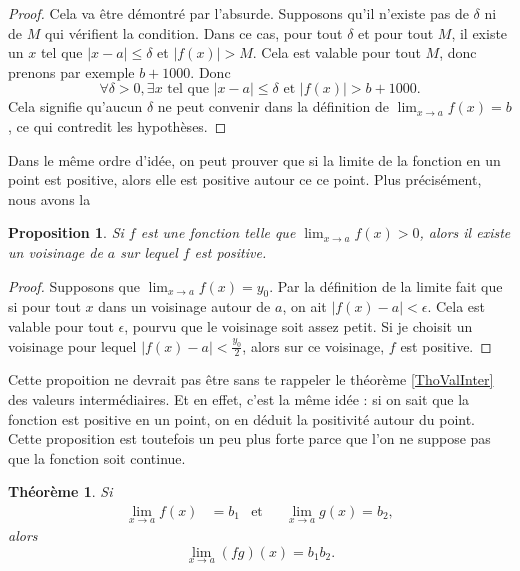 \documentclass[a4paper,12pt]{book}
\newcounter{numtho}
\theoremstyle{mes_exemples}	\newtheorem{exemple}[numtho]{Exemple}
\theoremstyle{mes_tho}
\newtheorem{proposition}[numtho]{Proposition}
\newtheorem{theorem}[numtho]{Théorème}
\begin{document}
\begin{proof}
	Cela va être démontré par l'absurde. Supposons qu'il n'existe pas de $\delta$ ni de $M$ qui vérifient la condition. Dans ce cas, pour tout $\delta$ et pour tout $M$, il existe un $x$ tel que $| x-a |\leq\delta$ et $| f(x) |> M$. Cela est valable pour tout $M$, donc prenons par exemple $b+1000$. Donc 
	\begin{equation}
	\forall\delta>0,\exists x\text{ tel que } | x-a |\leq\delta\text{ et }| f(x) |>b+1000.
	\end{equation}
	Cela signifie qu'aucun $\delta$ ne peut convenir dans la définition de $\lim_{x\to a}f(x)=b$, ce qui contredit les hypothèses.
\end{proof}

Dans le même ordre d'idée, on peut prouver que si la limite de la fonction en un point est positive, alors elle est positive autour ce ce point. Plus précisément, nous avons la
\begin{proposition}	\label{PropoLimPosFPos}
	Si $f$ est une fonction telle que $\lim_{x\to a}f(x)>0$, alors il existe un voisinage de $a$ sur lequel $f$ est positive.
\end{proposition}	

\begin{proof}
	Supposons que $\lim_{x\to a}f(x)=y_0$. Par la définition de la limite fait que si pour tout $x$ dans un voisinage autour de $a$, on ait $| f(x)-a |<\epsilon$. Cela est valable pour tout $\epsilon$, pourvu que le voisinage soit assez petit. Si je choisit un voisinage pour lequel $| f(x)-a |<\frac{ y_0 }{ 2 }$, alors sur ce voisinage, $f$ est positive.
\end{proof}

Cette propoition ne devrait pas être sans te rappeler le théorème \ref{ThoValInter} des valeurs intermédiaires. Et en effet, c'est la même idée : si on sait que la fonction est positive en un point, on en déduit la positivité autour du point. Cette proposition est toutefois un peu plus forte parce que l'on ne suppose pas que la fonction soit continue.

\begin{theorem}		\label{Tholimfgabab}
	Si
	\begin{align}
		\lim_{x\to a}f(x)&=b_1&\text{et}&&\lim_{x\to a}g(x)=b_2,
	\end{align}
	alors
	\begin{equation}
		\lim_{x\to a}(fg)(x)=b_1b_2.
	\end{equation}
\end{theorem}
\end{document}
